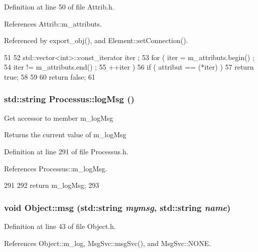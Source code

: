 Definition at line 50 of file Attrib.h.

References Attrib::m\_\-attributs.

Referenced by export\_\-obj(), and Element::setConnection().


\begin{DoxyCode}
51   {
52     std::vector<int>::const_iterator iter ;
53     for ( iter  = m_attributs.begin() ;
54           iter != m_attributs.end()   ;
55           ++iter ) {
56       if ( attribut == (*iter) ) {
57         return true;
58       }
59     }
60     return false;
61   }
\end{DoxyCode}
\hypertarget{classProcessus_a42fdeb17dc13ba854222666b6aa29b61}{
\subsubsection[{logMsg}]{\setlength{\rightskip}{0pt plus 5cm}std::string Processus::logMsg ()}}
\label{classProcessus_a42fdeb17dc13ba854222666b6aa29b61}
Get accessor to member m\_\-logMsg \begin{DoxyReturn}{Returns}
the current value of m\_\-logMsg 
\end{DoxyReturn}


Definition at line 291 of file Processus.h.

References Processus::m\_\-logMsg.


\begin{DoxyCode}
291                       {
292     return m_logMsg;
293   }
\end{DoxyCode}
\hypertarget{classObject_ac5d59299273cee27aacf7de00d2e7034}{
\subsubsection[{msg}]{\setlength{\rightskip}{0pt plus 5cm}void Object::msg (std::string {\em mymsg}, \/  std::string {\em name})}}
\label{classObject_ac5d59299273cee27aacf7de00d2e7034}


Definition at line 43 of file Object.h.

References Object::m\_\-log, MsgSvc::msgSvc(), and MsgSvc::NONE.


